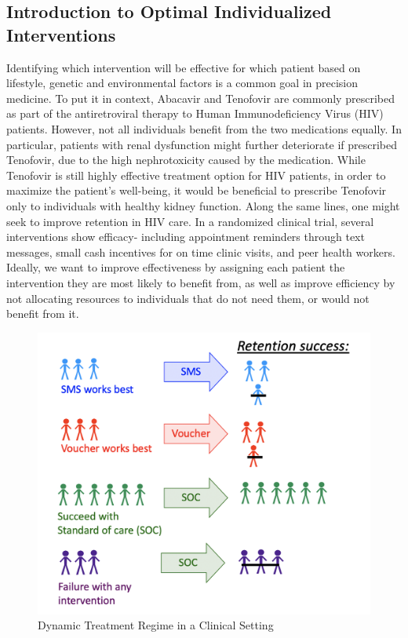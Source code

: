 \documentclass[12pt, krantz2,]{krantz}
\theoremstyle{definition}
\theoremstyle{definition}
\theoremstyle{definition}
\newcommand{\1}{\mathbbm{1}}
\begin{document}
\hypertarget{introduction-to-optimal-individualized-interventions}{%
\subsection{Introduction to Optimal Individualized Interventions}\label{introduction-to-optimal-individualized-interventions}}

Identifying which intervention will be effective for which patient based on
lifestyle, genetic and environmental factors is a common goal in precision
medicine. To put it in context, Abacavir and Tenofovir are commonly prescribed
as part of the antiretroviral therapy to Human Immunodeficiency Virus (HIV)
patients. However, not all individuals benefit from the two medications equally.
In particular, patients with renal dysfunction might further deteriorate if
prescribed Tenofovir, due to the high nephrotoxicity caused by the medication.
While Tenofovir is still highly effective treatment option for HIV patients, in
order to maximize the patient's well-being, it would be beneficial to prescribe
Tenofovir only to individuals with healthy kidney function. Along the same
lines, one might seek to improve retention in HIV care. In a randomized clinical
trial, several interventions show efficacy- including appointment reminders
through text messages, small cash incentives for on time clinic visits, and peer
health workers. Ideally, we want to improve effectiveness by assigning each
patient the intervention they are most likely to benefit from, as well as
improve efficiency by not allocating resources to individuals that do not need
them, or would not benefit from it.

\begin{figure}

{\centering \includegraphics[width=0.8\linewidth]{img/image/DynamicA_Illustration} 

}

\caption{Dynamic Treatment Regime in a Clinical Setting}\label{fig:unnamed-chunk-1}
\end{figure}
\end{document}
